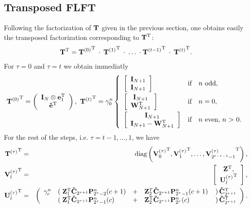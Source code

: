 \subsection{Transposed FLFT}
Following the factorization of $\mathbf{T}$ given in the previous section, one obtains easily the transposed factorization corresponding to $\mathbf{T^{\text{\rm{T}}}}$:
$$
  \mathbf{T}^{\text{\rm{T}}} = {\mathbf{T}^{(0)}}^{\text{\rm{T}}} \: \cdot \: {\mathbf{T}^{(1)}}^{\text{\rm{T}}} \: \cdot \: \ldots \: \cdot {\mathbf{T}^{(t-1)}}^{\text{\rm{T}}} \: \cdot \: {\mathbf{T}^{(t)}}^{\text{\rm{T}}}.
$$ 
For $\tau = 0$ and $\tau = t$ we obtain immediatly
$$
  {\V{T}^{(0)}}^{\transp} = 
     \left(\begin{array}{c} 
       \V{I}_{N} \otimes \V{e}_{1}^{\transp}\\ 
       \V{\tilde{e}}^{\transp} 
     \end{array}\right),\  
   {\V{T}^{(t)}}^{\transp} = \gamma_{0}^n 
     \left\{\begin{array}{l@{\quad \text{if} \quad}l} 
       \left[ \begin{array}{c} \V{I}_{N+1} \\ \V{I}_{N+1}                         \end{array} \right] & \text{$n$ odd},          \\[2ex]
       \left[ \begin{array}{c} \V{I}_{N+1} \\               \V{W}_{N+1}^{\transp} \end{array} \right] & \text{$n = 0$},          \\[2ex]
       \left[ \begin{array}{c} \V{I}_{N+1} \\ \V{I}_{N+1} - \V{W}_{N+1}^{\transp} \end{array} \right] & \text{$n$ even, $n$ > 0}.
     \end{array}\right.
$$
For the rest of the steps, i.e. $\tau = t-1,\ldots,1$, we have
\begin{eqnarray*}
 {\mathbf{T}^{(\tau)}}^{\text{\rm{T}}}   & = & \text{diag}\left({\mathbf{V}^{(\tau)}_0}^{\text{\rm{T}}},{\mathbf{V}^{(\tau)}_1}^{\text{\rm{T}}},\dots,{\mathbf{V}^{(\tau)}_{2^{t-\tau-1}-1}}^{\text{\rm{T}}}\right),\\
 {\mathbf{V}^{(\tau)}_l}^{\text{\rm{T}}} & = & \left[ \begin{array}{c} \mathbf{Z}^{\text{\rm{T}}},\\ 
 {\mathbf{U}^{(\tau)}_l}^{\text{\rm{T}}} \end{array} \right],\\
 {\mathbf{U}^{(\tau)}_l}^{\text{\rm{T}}} & = &
   \left(\begin{array}{rlllr}
     \gamma_{c}^n & \left(\right. \mathbf{Z}_{1}^{\text{\rm{T}}} \mathbf{\tilde{C}}_{2^{\tau+1}} \mathbf{P}_{2^{\tau}-2}^n{\hspace{-0.4ex}}\left(c+1\right) & + & \mathbf{Z}_{2}^T \mathbf{\tilde{C}}_{2^{\tau+1}} \mathbf{P}_{2^{\tau}-1}^n{\hspace{-0.4ex}}\left(c+1\right)                  & \left.\right) \mathbf{\tilde{C}}_{2^{\tau+1}}^{\text{\rm{T}}} \\
                  & \left(\right. \mathbf{Z}_{1}^{\text{\rm{T}}} \mathbf{\tilde{C}}_{2^{\tau+1}} \mathbf{P}_{2^{\tau}-1}^n{\hspace{-0.4ex}}\left(c\right) & + & \mathbf{Z}_{2}^{\text{\rm{T}}} \mathbf{\tilde{C}}_{2^{\tau+1}} \mathbf{P}_{2^{\tau}}^n{\hspace{-0.4ex}}\left(c\right) & \left.\right) \mathbf{\tilde{C}}_{2^{\tau+1}}^{\text{\rm{T}}}
     \end{array}
   \right).
\end{eqnarray*}

